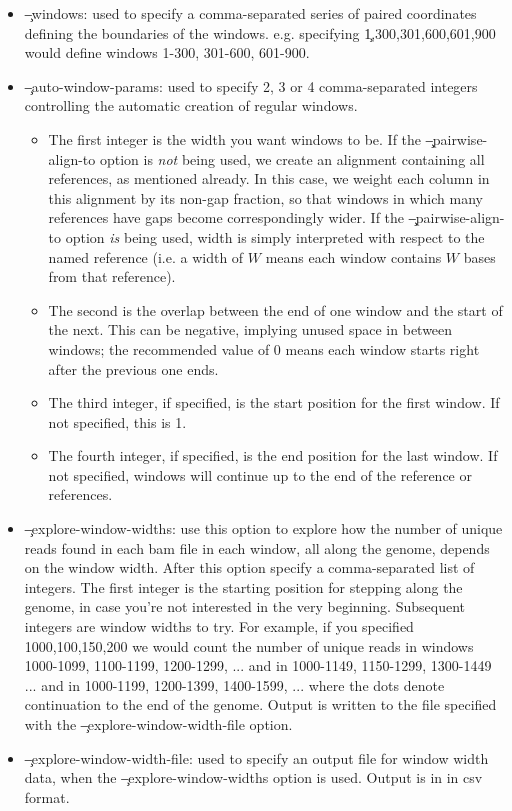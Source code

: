 \begin{itemize}
\item \c{--windows}: used to specify a comma-separated series of paired coordinates defining the boundaries of the windows.
e.g. specifying \c{1,300,301,600,601,900} would define windows 1-300, 301-600, 601-900.
\item \c{--auto-window-params}: used to specify 2, 3 or 4 comma-separated integers controlling the automatic creation of regular windows.
\begin{itemize}
\item The first integer is the width you want windows to be.
If the \c{--pairwise-align-to} option is {\it not} being used, we create an alignment containing all references, as mentioned already.
In this case, we weight each column in this alignment by its non-gap fraction, so that windows in which many references have gaps become correspondingly wider.
If the \c{--pairwise-align-to} option {\it is} being used, width is simply interpreted with respect to the named reference (i.e. a width of $W$ means each window contains $W$ bases from that reference).
\item The second is the overlap between the end of one window and the start of the next.
This can be negative, implying unused space in between windows; the recommended value of 0 means each window starts right after the previous one ends.
\item The third integer, if specified, is the start position for the first window.
If not specified, this is 1.
\item The fourth integer, if specified, is the end position for the last window.
If not specified, windows will continue up to the end of the reference or references.
\end{itemize}
\item \c{--explore-window-widths}: use this option to explore how the number of unique reads found in each bam file in each window, all along the genome, depends on the window width.
After this option specify a comma-separated list of integers.
The first integer is the starting position for stepping along the genome, in case you're not interested in the very beginning.
Subsequent integers are window widths to try.
For example, if you specified 1000,100,150,200 we would count the number of unique reads in windows 1000-1099, 1100-1199, 1200-1299, ... and in 1000-1149, 1150-1299, 1300-1449 ... and in 1000-1199, 1200-1399, 1400-1599, ... where the dots denote continuation to the end of the genome.
Output is written to the file specified with the \c{--explore-window-width-file} option.
\item \c{--explore-window-width-file}: used to specify an output file for window width data, when the \c{--explore-window-widths} option is used.
Output is in in csv format.
\end{itemize}

